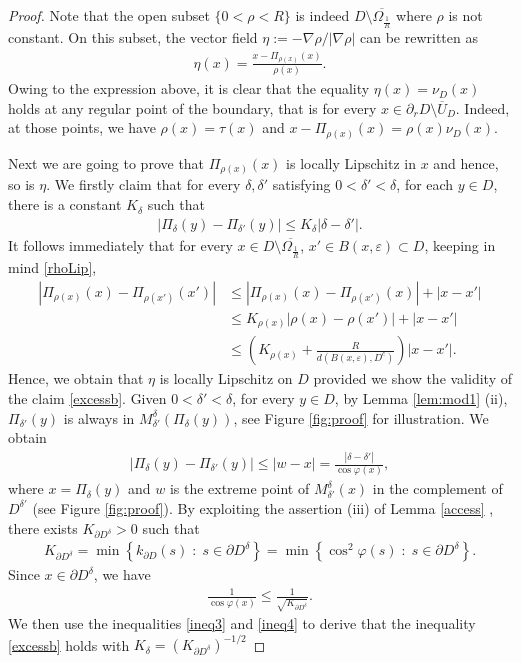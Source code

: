 \documentclass[reqno,11pt]{amsart}
\theoremstyle{definition}
\numberwithin{equation}{section}
\def\e{\varepsilon}
\def\ov{\overline}
\newcommand{\1}{{{\bf 1}\kern-0,28em\rm l}}
\def\sepa{\; : \;}
\def\proj{\Pi}
\begin{document}
\begin{proof}
Note that the open subset $\{0<\rho <R\}$ is indeed $D\setminus \ov{\Omega_{\frac 1R}}$ where $\rho$ is not constant. On this subset, the vector field $\eta:=-\nabla \rho/|\nabla \rho|$ can be rewritten as
\begin{align*}
\eta(x)= \frac{x- \proj_{\rho(x)} (x)}{\rho(x)}.
\end{align*}
Owing to the expression above, it is clear that the equality $\eta(x)=\nu_D(x)$ holds at any regular point of the boundary, that is  for every $x\in \partial_r D\setminus \ov U_D$.
Indeed,  at those points, we have $\rho(x)=\tau(x)$ and $x-\proj_{\rho(x)} (x)= \rho(x) \nu_D(x)$. 

Next we are going to prove that $\proj_{\rho(x)} (x)$ is locally Lipschitz in $x$ and hence, so is $\eta$.
We firstly claim that for every $\delta, \delta'$ satisfying $0<\delta'<\delta$, for each $y\in D$, there is a constant $K_\delta$ such that 
\begin{align}
|\proj_\delta (y)- \proj_{\delta'} (y)| \le K_\delta |\delta-\delta'|.
\label{excessb}
\end{align}
It follows immediately that for every $x\in D\setminus \ov{\Omega_{\frac 1R}}$, $x'\in B(x,\e)\subset D$, keeping in mind \eqref{rhoLip},
\begin{align*}
|\proj_{\rho(x)} (x)- \proj_{\rho(x')} (x')|
&\le | \proj_{\rho(x)} (x)- \proj_{\rho(x')} (x)| + |x-x'|\\
&\le K_{\rho(x)}|\rho(x)-\rho(x')|+|x-x'| \\
&\le \left( K_{\rho(x)} + \frac{R}{d(B(x,\e),D^c)} \right)|x-x'|.
\end{align*}
Hence, we obtain that $\eta$ is locally Lipschitz on $D$ provided 
we show the validity of the claim \eqref{excessb}. 
Given $0<\delta' <\delta$, for every $y\in D$, by Lemma \ref{lem:mod1} (ii), $\proj_{\delta'} (y)$ is always in  $M^\delta_{\delta'}( \proj_\delta (y) )$, see Figure \ref{fig:proof} for illustration. We obtain
\begin{align}
|\proj_\delta (y) - \proj_{\delta'} (y)| \le |w-x|=\frac{|\delta-\delta'|}{\cos\varphi(x)},
\label{ineq3}
\end{align}
where $x= \proj_\delta (y)$ and $w$ is the extreme point of $M^\delta_{\delta'}(x)$ in the complement of $D^{\delta'}$ (see Figure \ref{fig:proof}).
By exploiting the assertion (iii) of Lemma \ref{access} , there exists $K_{\partial D^\delta}>0$ such that 
\begin{align*}
K_{\partial D^\delta}
=\min \left\{ k_{\partial D}(s) \sepa s\in \partial D^\delta  \right\} = \min \left\{ \cos^2\varphi(s) \sepa s\in \partial D^\delta  \right\}.
\end{align*}
Since $x\in \partial D^\delta$, we have
\begin{align}
\frac{1}{\cos\varphi(x)} \le \frac{1}{\sqrt{K_{\partial D^\delta}}}.
\label{ineq4}
\end{align}
We then use the inequalities \eqref{ineq3} and \eqref{ineq4} to derive that the inequality \eqref{excessb} holds  with $K_\delta = (K_{\partial D^\delta})^{-1/2}$




\end{proof}
\end{document}
